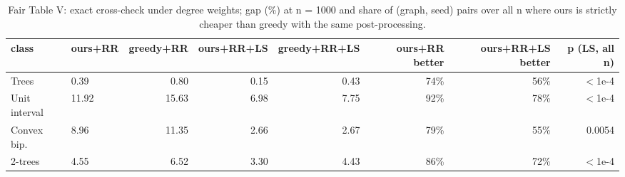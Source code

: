 \begin{table}[t]
\centering
\caption{Fair Table V: exact cross-check under degree weights; gap (\%) at n = 1000 and share of (graph, seed) pairs over all n where ours is strictly cheaper than greedy with the same post-processing.}
\label{tab:exact_fair_t5}
\scriptsize
\begin{tabular}{llrrrrrr}
\toprule
class & ours+RR & greedy+RR & ours+RR+LS & greedy+RR+LS & ours+RR better & ours+RR+LS better & p (LS, all n) \\
\midrule
Trees & 0.39 & 0.80 & 0.15 & 0.43 & 74\% & 56\% & $<$1e-4 \\
Unit interval & 11.92 & 15.63 & 6.98 & 7.75 & 92\% & 78\% & $<$1e-4 \\
Convex bip. & 8.96 & 11.35 & 2.66 & 2.67 & 79\% & 55\% & 0.0054 \\
2-trees & 4.55 & 6.52 & 3.30 & 4.43 & 86\% & 72\% & $<$1e-4 \\
\bottomrule
\end{tabular}
\end{table}
